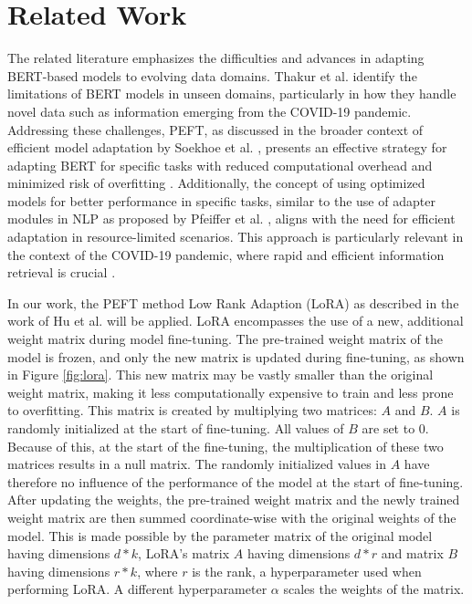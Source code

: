 \documentclass[sigconf, natbib=true]{acmart}
\begin{document}
\section{Related Work}
\label{sec:work}
The related literature emphasizes the difficulties and advances in adapting BERT-based models to evolving data domains. 
Thakur et al. \cite{thakur2021beir} identify the limitations of BERT models in unseen domains, particularly in how they handle novel data such as information emerging from the COVID-19 pandemic. 
Addressing these challenges, PEFT, as discussed in the broader context of efficient model adaptation by Soekhoe et al. \cite{Soekhoe2016}, presents an effective strategy for adapting BERT for specific tasks with reduced computational overhead and minimized risk of overfitting \cite{bejani2021systematic}. 
Additionally, the concept of using optimized models for better performance in specific tasks, similar to the use of adapter modules in NLP as proposed by Pfeiffer et al. \cite{pfeiffer2020}, aligns with the need for efficient adaptation in resource-limited scenarios. 
This approach is particularly relevant in the context of the COVID-19 pandemic, where rapid and efficient information retrieval is crucial \cite{voorhees2021trec}.

In our work, the PEFT method Low Rank Adaption (LoRA) as described in the work of Hu et al. \cite{hu2022lora} will be applied. 
LoRA encompasses the use of a new, additional weight matrix during model fine-tuning.
The pre-trained weight matrix of the model is frozen, and only the new matrix is updated during fine-tuning, as shown in Figure \ref{fig:lora}.
This new matrix may be vastly smaller than the original weight matrix, making it less computationally expensive to train and less prone to overfitting.
This matrix is created by multiplying two matrices: $A$ and $B$. $A$ is randomly initialized at the start of fine-tuning. 
All values of $B$ are set to $0$. 
Because of this, at the start of the fine-tuning, the multiplication of these two matrices results in a null matrix. 
The randomly initialized values in $A$ have therefore no influence of the performance of the model at the start of fine-tuning.
After updating the weights, the pre-trained weight matrix and the newly trained weight matrix are then summed coordinate-wise with the original weights of the model.
This is made possible by the parameter matrix of the original model having dimensions $d*k$, LoRA's matrix $A$ having dimensions $d*r$ and matrix $B$ having dimensions $r*k$, where $r$ is the rank, a hyperparameter used when performing LoRA. A different hyperparameter $\alpha$ scales the weights of the matrix.
\end{document}

